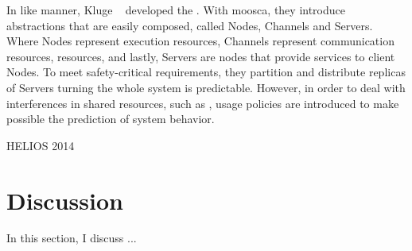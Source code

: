 	In like manner, Kluge \etal~\cite{Kluge2014} developed the \moosca.
	With moosca, they introduce abstractions that are easily composed, called Nodes,
	Channels and Servers.
	Where Nodes represent execution resources, Channels represent communication resources,
	\ie \noc resources, and lastly, Servers are nodes that provide services to client Nodes.
	To meet safety-critical requirements, they partition \manycore and distribute replicas
	of Servers turning the whole system is predictable.
	However, in order to deal with interferences in shared resources, such as \noc,
	usage policies are introduced to make possible the prediction of system behavior.

	HELIOS 2014

\section{Discussion}
	In this section, I discuss ...
